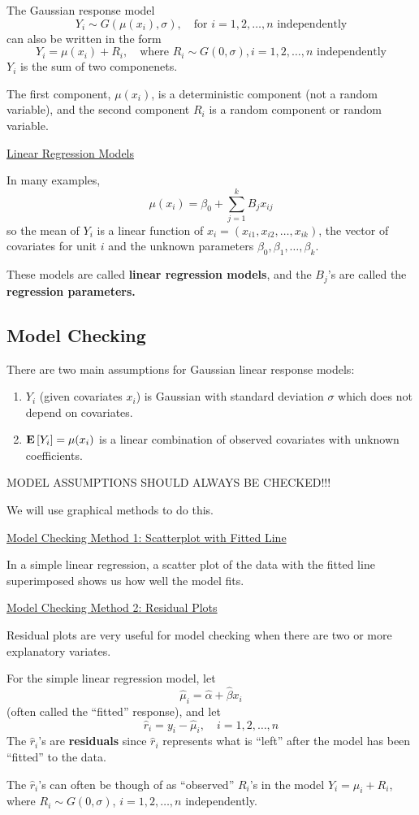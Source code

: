 The Gaussian response model
\[Y_{i} \sim G\left(\mu\left(x_{i}\right), \sigma\right), \quad \text{for } i=1,2, \ldots, n \text{ independently}\]
can also be written in the form
\[Y_{i}=\mu\left(x_{i}\right)+R_{i}, \quad \text{where } R_{i} \sim G(0, \sigma), i=1,2, \ldots, n \text{ independently}\]
$ Y_i $ is the sum of two componenets.

The first component, $ \mu(x_i) $, is a deterministic component (not a random variable),
and the second component $ R_i $ is a random component or random variable.

\underline{Linear Regression Models}

In many examples,
\[ \mu(x_i)=\beta_0+\sum\limits_{j=1}^{k} B_j x_{ij} \]
so the mean of $ Y_i $ is a linear function of $ x_i=(x_{i1},x_{i2},\ldots ,x_{ik}) $,
the vector of covariates for unit $ i $ and the unknown parameters $ \beta_0,\beta_1,\ldots ,\beta_k $.

These models are called \textbf{linear regression models}, and the $ B_j $'s are called the
\textbf{regression parameters.}

\subsection{Model Checking}
There are two main assumptions for Gaussian linear response models:
\begin{enumerate}
    \item $ Y_i $ (given covariates $ x_i $) is Gaussian with standard deviation $ \sigma $
          which does not depend on covariates.
    \item $ \bm{\mathrm{E}}\left[Y_i\right]=\mu(x_i) $ is a linear combination of observed covariates with
          unknown coefficients.
\end{enumerate}
\begin{center}
    MODEL ASSUMPTIONS SHOULD ALWAYS BE CHECKED!!!
\end{center}
We will use graphical methods to do this.

\underline{Model Checking Method 1: Scatterplot with Fitted Line}

In a simple linear regression, a scatter plot of the data with the fitted line superimposed
shows us how well the model fits.

\underline{Model Checking Method 2: Residual Plots}

Residual plots are very useful for model checking when there are two or more explanatory
variates.
\begin{defbox}
    \begin{definition}
        For the simple linear regression model, let
        \[ \hat{\mu}_i=\hat{\alpha}+\hat{\beta}x_i \]
        (often called the ``fitted'' response), and let
        \[ \hat{r}_i=y_i-\hat{\mu}_i,\quad i=1,2,\ldots ,n \]
        The $ \hat{r}_i $'s are \textbf{residuals} since $ \hat{r}_i $ represents
        what is ``left'' after the model has been ``fitted'' to the data.
    \end{definition}
\end{defbox}
The $ \hat{r}_i $'s can often be though of as ``observed'' $ R_i $'s in the model $ Y_i=\mu_i+R_i $,
where $ R_i\sim G(0,\sigma) $, $ i=1,2,\ldots ,n $ independently.

